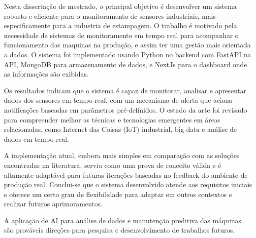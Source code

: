
Nesta dissertação de mestrado, o principal objetivo é desenvolver um sistema robusto e eficiente para o monitoramento de sensores industriais, mais especificamente para a industria de estampagem. O trabalho é motivado pela necessidade de sistemas de monitoramento em tempo real para acompanhar o funcionamento das maquinas na produção, e assim ter uma gestão mais orientada a dados. O sistema foi implementado usando Python no backend com FastAPI na API, MongoDB para armazenamento de dados, e NextJs para o dashboard onde as informações são exibidas.

Os resultados indicam que o sistema é capaz de monitorar, analisar e apresentar dados dos sensores em tempo real, com um mecanismo de alerta que aciona notificações baseadas em parâmetros pré-definidos. O estado da arte foi revisado para compreender melhor as técnicas e tecnologias emergentes em áreas relacionadas, como Internet das Coisas (IoT) industrial, big data e análise de dados em tempo real.

A implementação atual, embora mais simples em comparação com as soluções encontradas na literatura, serviu como uma prova de conceito válida e é altamente adaptável para futuras iterações baseadas no feedback do ambiente de produção real. Conclui-se que o sistema desenvolvido atende aos requisitos iniciais e oferece um certo grau de flexibilidade para adaptar em outros contextos e realizar futuros aprimoramentos. 

A aplicação de \gls{AI} para análise de dados e manutenção preditiva das máquinas são prováveis direções para pesquisa e desenvolvimento de trabalhos futuros. 

\mbox{}\linebreak
{} 

